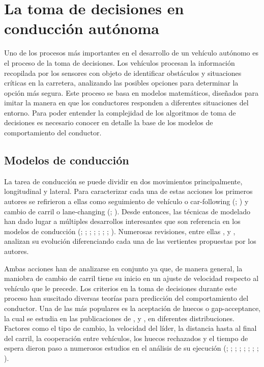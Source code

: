 \section{La toma de decisiones en conducción autónoma }
Uno de los procesos más importantes en el desarrollo de un vehículo autónomo es el proceso de la toma de decisiones. Los vehículos procesan la información recopilada por los sensores con objeto de identificar obstáculos y situaciones críticas en la carretera, analizando las posibles opciones para determinar la opción más segura. Este proceso se basa en modelos matemáticos, diseñados para imitar la manera en que los conductores responden a diferentes situaciones del entorno. Para poder entender la complejidad de los algoritmos de toma de decisiones es necesario conocer en detalle la base de los modelos de comportamiento del conductor.

\subsection{Modelos de conducción}
La tarea de conducción se puede dividir en dos movimientos principalmente, longitudinal y lateral. Para caracterizar cada una de estas acciones los primeros autores se refirieron a ellas como seguimiento de vehículo o car-following (\cite{reuschel}; \cite{pipes}) y cambio de carril o lane-changing (\cite{sparmann}; \cite{gipps}). Desde entonces, las técnicas de modelado han dado lugar a múltiples desarrollos interesantes que son referencia en los modelos de conducción (\cite{chandler}; \cite{herman59}; \cite{newell}; \cite{gazis}; \cite{bexelius}; \cite{ahmed96}; \cite{halati}; \cite{toledo03}). Numerosas revisiones, entre ellas \textcite{brackstone}, \textcite{olstam} y \textcite{diaz}, analizan su evolución diferenciando cada una de las vertientes propuestas por los autores. 

Ambas acciones han de analizarse en conjunto ya que, de manera general, la maniobra de cambio de carril tiene su inicio en un ajuste de velocidad respecto al vehículo que le precede. Los criterios en la toma de decisiones durante este proceso han suscitado diversas teorías para predicción del comportamiento del conductor. Una de las más populares es la aceptación de huecos o gap-acceptance, la cual se estudia en las publicaciones de \textcite{herman61}, \textcite{drew} y \textcite{miller}, en diferentes distribuciones. Factores como el tipo de cambio, la velocidad del líder, la distancia hasta al final del carril, la cooperación entre vehículos, los huecos rechazados y el tiempo de espera dieron paso a numerosos estudios en el análisis de su ejecución (\cite{mahmassani}; \cite{gipps}; \cite{madanat}; \cite{cassidy}; \cite{ahmed96}; \cite{yang96}; \cite{halati}; \cite{hidas}; \cite{toledo07}).

